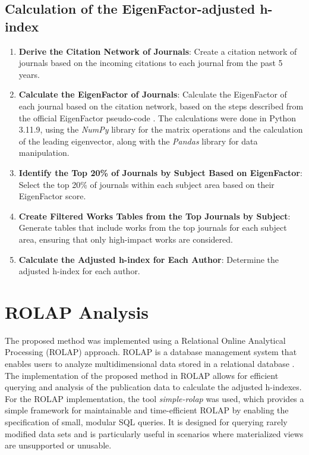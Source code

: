 \subsection{Calculation of the EigenFactor-adjusted h-index}
\begin{enumerate}
      \item \textbf{Derive the Citation Network of Journals}: Create a citation network of journals based on the
            incoming citations to each journal from the past 5 years.
      \item \textbf{Calculate the EigenFactor of Journals}: Calculate the EigenFactor of each journal based on the
            citation network, based on the steps
            described from the official EigenFactor pseudo-code \cite{west2008pseudocode}. The calculations were done  in Python
            3.11.9, using the \emph{NumPy} library for the matrix operations and the
            calculation of the leading eigenvector, along with the \emph{Pandas} library
            for data manipulation.
      \item \textbf{Identify the Top 20\% of Journals by Subject Based on EigenFactor}: Select the top 20\% of journals within
            each subject area based on their EigenFactor score\@.

      \item \textbf{Create Filtered Works Tables from the Top Journals by Subject}: Generate tables that include works from
            the top journals for each subject area, ensuring that only high-impact works are considered.

      \item \textbf{Calculate the Adjusted h-index for Each Author}: Determine the adjusted h-index for each author.
\end{enumerate}

\section{ROLAP Analysis}

The proposed method was implemented using a Relational Online Analytical
Processing (ROLAP) approach. ROLAP is a database management system that enables
users to analyze multidimensional data stored in a relational database
\cite{codd1993providing}. The implementation of the proposed method in ROLAP
allows for efficient querying and analysis of the publication data to calculate
the adjusted h-indexes. For the ROLAP implementation, the tool
\emph{simple-rolap} \cite{simple-rolap} was used, which provides a simple
framework for maintainable and time-efficient ROLAP by enabling the
specification of small, modular SQL queries. It is designed for querying rarely
modified data sets and is particularly useful in scenarios where materialized
views are unsupported or unusable.

